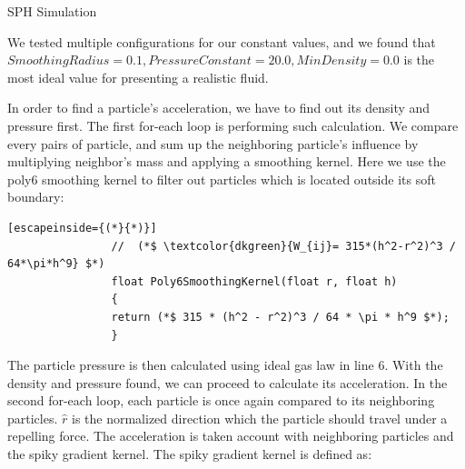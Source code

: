 \documentclass{article}
\begin{document}
\begin{multicols}{2}
			\begin{algorithm}[H]
				\caption{SPH Simulation}
			\end{algorithm}
			
			We tested multiple configurations for our constant values, and we found that $SmoothingRadius = 0.1, PressureConstant = 20.0, MinDensity = 0.0$ is the most ideal value for presenting a realistic fluid.

			In order to find a particle's acceleration, we have to find out its density and pressure first. The first for-each loop is performing such calculation. We compare every pairs of particle, and sum up the neighboring particle's influence by multiplying neighbor's mass and applying a smoothing kernel. Here we use the poly6 smoothing kernel to filter out particles which is located outside its soft boundary: 
			
			\noindent
			\begin{minipage}{\linewidth}
				\begin{lstlisting}[escapeinside={(*}{*)}]
				//  (*$ \textcolor{dkgreen}{W_{ij}= 315*(h^2-r^2)^3 / 64*\pi*h^9} $*)
				float Poly6SmoothingKernel(float r, float h)
				{
				return (*$ 315 * (h^2 - r^2)^3 / 64 * \pi * h^9 $*);
				}
				\end{lstlisting}
			\end{minipage}
		
			The particle pressure is then calculated using ideal gas law in line 6. With the density and pressure found, we can proceed to calculate its acceleration. In the second for-each loop, each particle is once again compared to its neighboring particles. $\hat{r}$ is the normalized direction which the particle should travel under a repelling force. The acceleration is taken account with neighboring particles and the spiky gradient kernel. The spiky gradient kernel is defined as:
			

\end{multicols}
\end{document}
